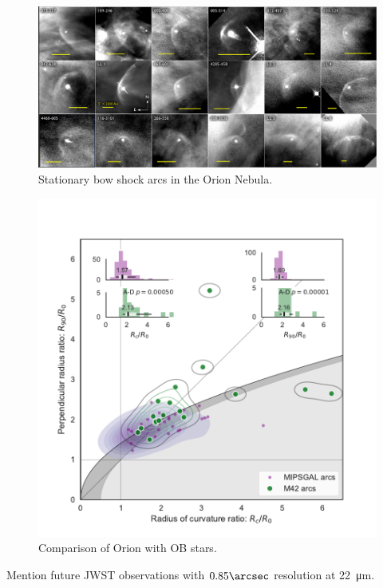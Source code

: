 \begin{figure}
  \centering
  \includegraphics[width=\textwidth]{figs/annotated-ll-arcs}
  \caption[]{Stationary bow shock arcs in the Orion Nebula.}
  \label{fig:ll-arcs}
\end{figure}

\begin{figure}
  \centering
  \includegraphics[width=\linewidth]{figs/mipsgal-Rc-R90-vs-Orion}
  \caption[]{Comparison of Orion with OB stars.}
  \label{fig:ll-compare-mipsgal}
\end{figure}


Mention future JWST observations with \(0.85\arcsec\) resolution at \SI{22}{\um}. 


